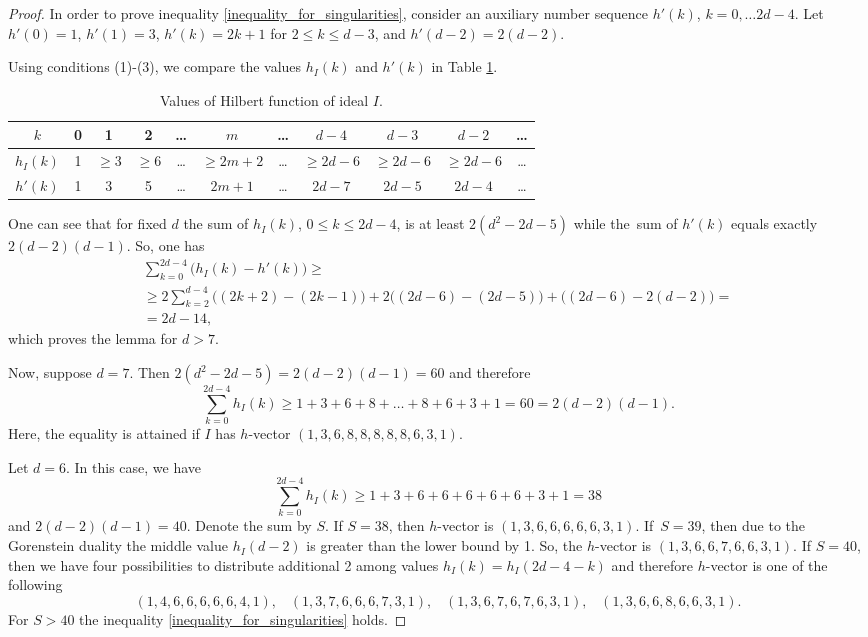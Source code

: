 \documentclass[a4paper,11pt,english,german]{amsart}
\theoremstyle{definition}
\begin{document}
\begin{proof}
	In order to prove inequality \eqref{inequality_for_singularities}, consider an auxiliary number sequence $h'(k)$, $k=0,\dots 2d-4$. Let $h'(0)=1$, $h'(1)=3$, $h'(k)=2k+1$ for $2\leqslant k \leqslant d-3$, and $h'(d-2)=2(d-2)$.
	

	Using conditions (1)-(3), we compare the values $h_I(k)$ and $h'(k)$ in Table \ref{table}.
	
	\begin{table}[h!]
	\centering
		\begin{tabular}{| c | c | c | c | c | c | c | c | c | c | c |}\hline 
		$k$ & 0 & 1 & 2  & \dots & $m$ & \dots & $d-4$ & $d-3$ & $d-2$ & \dots \\ \hline
		$h_I(k)$ & 1 & $\geqslant 3$ & $\geqslant 6$ & \dots & $\geqslant 2m+2$ & \dots & $\geqslant 2d-6$ &  $\geqslant 2d-6$ & $\geqslant 2d-6$ & \dots   \\ \hline
		$h'(k)$ & 1 & 3 & 5 & \dots & $2m+1$ & \dots & $2d-7$ & $2d-5$ & $2d-4$ & \dots \\ \hline
	\end{tabular}
	\caption{Values of Hilbert function of ideal $I$.}
	\label{table}
	\end{table}
	One can see that for fixed $d$ the sum of $h_I(k)$, $0\leqslant k\leqslant 2d-4$, is at least $2(d^2-2d-5)$ while the~sum of $h'(k)$ equals exactly $2(d-2)(d-1)$. So, one has 
		\begin{multline*}
		\sum\limits_{k=0}^{2d-4}\bigg(h_I(k)-h'(k)\bigg)\geqslant  \\
		\geqslant 2\sum\limits_{k=2}^{d-4}\bigg((2k+2)-(2k-1)\bigg)+ 2 \bigg( (2d-6) -(2d-5)\bigg) +\bigg((2d-6)-2(d-2)\bigg)=\\
		=2d-14,
	\end{multline*}
	which proves the lemma for $d>7$. 
	
	Now, suppose $d=7$. Then $2(d^2-2d-5)=2(d-2)(d-1)=60$ and therefore
	$$\sum\limits_{k=0}^{2d-4}h_I(k)\geqslant 1+3+6+8+\dots+8+6+3+1=60= 2(d-2)(d-1).$$ Here, the equality is attained if $I$ has $h$-vector $(1,3,6,8,8,8,8,8,6,3,1)$. 
	
	Let $d=6$. In this case, we have 
	$$\sum\limits_{k=0}^{2d-4}h_I(k)\geqslant 1+3+6+6+6+6+6+3+1= 38$$
	and $2(d-2)(d-1)=40$. Denote the sum by $S$. If $S=38$, then $h$-vector is $(1,3,6,6,6,6,6,3,1)$. \mbox{If $S=39$,} then due to the Gorenstein duality the middle value $h_I(d-2)$ is greater than the lower bound by 1. So, the $h$-vector is $(1,3,6,6,7,6,6,3,1)$. If $S=40$, then we have four possibilities to distribute additional 2 among values $h_I(k)=h_I(2d-4-k)$ and therefore $h$-vector is one of the following
	$$(1,4,6,6,6,6,6,4,1), \hspace{10pt}(1,3,7,6,6,6,7,3,1), \hspace{10pt} (1,3,6,7,6,7,6,3,1), \hspace{10pt} (1,3,6,6,8,6,6,3,1).$$
	For $S>40$ the inequality \eqref{inequality_for_singularities} holds.

\end{proof}
\end{document}
